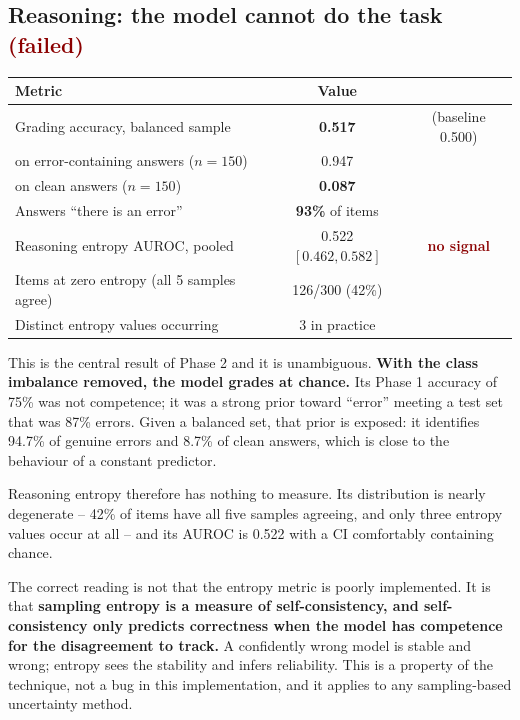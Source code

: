 \documentclass[11pt]{article}
\newcommand{\failed}[1]{\textcolor{darkred}{\textbf{#1}}}
\begin{document}
\subsection{Reasoning: the model cannot do the task \failed{(failed)}}
\label{sec:reasoning-dead}

\begin{center}
\begin{tabular}{lcc}
\toprule
Metric & Value & \\
\midrule
Grading accuracy, balanced sample & \textbf{0.517} & (baseline 0.500) \\
\quad on error-containing answers ($n=150$) & 0.947 & \\
\quad on clean answers ($n=150$) & \textbf{0.087} & \\
Answers ``there is an error'' & \textbf{93\%} of items & \\
\midrule
Reasoning entropy AUROC, pooled & 0.522 $[0.462, 0.582]$ & \failed{no signal} \\
Items at zero entropy (all 5 samples agree) & 126/300 (42\%) & \\
Distinct entropy values occurring & 3 in practice & \\
\bottomrule
\end{tabular}
\end{center}

This is the central result of Phase 2 and it is unambiguous. \textbf{With the
class imbalance removed, the model grades at chance.} Its Phase 1 accuracy of
75\% was not competence; it was a strong prior toward ``error'' meeting a test
set that was 87\% errors. Given a balanced set, that prior is exposed: it
identifies 94.7\% of genuine errors and 8.7\% of clean answers, which is close
to the behaviour of a constant predictor.

Reasoning entropy therefore has nothing to measure. Its distribution is nearly
degenerate -- 42\% of items have all five samples agreeing, and only three
entropy values occur at all -- and its AUROC is 0.522 with a CI comfortably
containing chance.

The correct reading is not that the entropy metric is poorly implemented. It is
that \textbf{sampling entropy is a measure of self-consistency, and
self-consistency only predicts correctness when the model has competence for
the disagreement to track.} A confidently wrong model is stable and wrong;
entropy sees the stability and infers reliability. This is a property of the
technique, not a bug in this implementation, and it applies to any
sampling-based uncertainty method.
\end{document}
